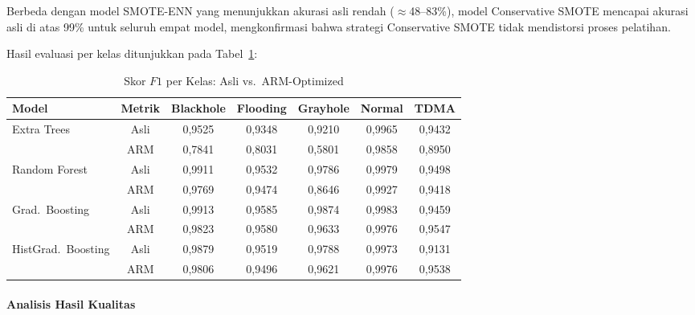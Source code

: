 Berbeda dengan model SMOTE-ENN yang menunjukkan akurasi asli rendah ($\approx$48--83\%), model Conservative SMOTE mencapai akurasi asli di atas 99\% untuk seluruh empat model, mengkonfirmasi bahwa strategi Conservative SMOTE tidak mendistorsi proses pelatihan.

Hasil evaluasi per kelas ditunjukkan pada Tabel~\ref{tab:per_class_f1}:

\begin{table}[htbp]
\centering
\caption{Skor $F1$ per Kelas: Asli vs.\ ARM-Optimized}
\label{tab:per_class_f1}
\begin{tabular}{lcccccc}
\hline
\textbf{Model} & \textbf{Metrik} & \textbf{Blackhole} & \textbf{Flooding} & \textbf{Grayhole} & \textbf{Normal} & \textbf{TDMA} \\
\hline
\multirow{2}{*}{Extra Trees}
  & Asli & 0,9525 & 0,9348 & 0,9210 & 0,9965 & 0,9432 \\
  & ARM  & 0,7841 & 0,8031 & 0,5801 & 0,9858 & 0,8950 \\
\hline
\multirow{2}{*}{Random Forest}
  & Asli & 0,9911 & 0,9532 & 0,9786 & 0,9979 & 0,9498 \\
  & ARM  & 0,9769 & 0,9474 & 0,8646 & 0,9927 & 0,9418 \\
\hline
\multirow{2}{*}{Grad.\ Boosting}
  & Asli & 0,9913 & 0,9585 & 0,9874 & 0,9983 & 0,9459 \\
  & ARM  & 0,9823 & 0,9580 & 0,9633 & 0,9976 & 0,9547 \\
\hline
\multirow{2}{*}{HistGrad.\ Boosting}
  & Asli & 0,9879 & 0,9519 & 0,9788 & 0,9973 & 0,9131 \\
  & ARM  & 0,9806 & 0,9496 & 0,9621 & 0,9976 & 0,9538 \\
\hline
\end{tabular}
\end{table}

\paragraph{Analisis Hasil Kualitas}

